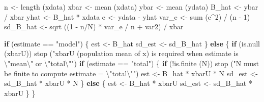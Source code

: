 \documentclass[
  letterpaper,
  DIV=11,
  numbers=noendperiod]{scrreprt}
\newenvironment{Shaded}{\begin{snugshade}}{\end{snugshade}}
\newcommand{\ControlFlowTok}[1]{\textcolor[rgb]{0.00,0.23,0.31}{\textbf{#1}}}
\newcommand{\DecValTok}[1]{\textcolor[rgb]{0.68,0.00,0.00}{#1}}
\newcommand{\FunctionTok}[1]{\textcolor[rgb]{0.28,0.35,0.67}{#1}}
\newcommand{\NormalTok}[1]{\textcolor[rgb]{0.00,0.23,0.31}{#1}}
\newcommand{\OtherTok}[1]{\textcolor[rgb]{0.00,0.23,0.31}{#1}}
\newcommand{\SpecialCharTok}[1]{\textcolor[rgb]{0.37,0.37,0.37}{#1}}
\newcommand{\StringTok}[1]{\textcolor[rgb]{0.13,0.47,0.30}{#1}}
\renewcommand{\[}{\begin{equation}}
\renewcommand{\]}{\end{equation}}
\begin{document}
\begin{Shaded}
\begin{Highlighting}[]
\NormalTok{  n }\OtherTok{\textless{}{-}} \FunctionTok{length}\NormalTok{ (xdata)}
\NormalTok{  xbar }\OtherTok{\textless{}{-}} \FunctionTok{mean}\NormalTok{ (xdata)}
\NormalTok{  ybar }\OtherTok{\textless{}{-}} \FunctionTok{mean}\NormalTok{ (ydata)}
\NormalTok{  B\_hat }\OtherTok{\textless{}{-}}\NormalTok{ ybar }\SpecialCharTok{/}\NormalTok{ xbar}
\NormalTok{  yhat }\OtherTok{\textless{}{-}}\NormalTok{ B\_hat }\SpecialCharTok{*}\NormalTok{ xdata}
\NormalTok{  e }\OtherTok{\textless{}{-}}\NormalTok{ ydata }\SpecialCharTok{{-}}\NormalTok{ yhat}
\NormalTok{  var\_e }\OtherTok{\textless{}{-}} \FunctionTok{sum}\NormalTok{ (e}\SpecialCharTok{\^{}}\DecValTok{2}\NormalTok{) }\SpecialCharTok{/}\NormalTok{ (n }\SpecialCharTok{{-}} \DecValTok{1}\NormalTok{)}
\NormalTok{  sd\_B\_hat }\OtherTok{\textless{}{-}} \FunctionTok{sqrt}\NormalTok{ ((}\DecValTok{1} \SpecialCharTok{{-}}\NormalTok{ n}\SpecialCharTok{/}\NormalTok{N) }\SpecialCharTok{*}\NormalTok{ var\_e }\SpecialCharTok{/}\NormalTok{ n }\SpecialCharTok{+}\NormalTok{ var2) }\SpecialCharTok{/}\NormalTok{ xbar}

  \ControlFlowTok{if}\NormalTok{ (estimate }\SpecialCharTok{==} \StringTok{"model"}\NormalTok{)}
\NormalTok{  \{}
\NormalTok{      est }\OtherTok{\textless{}{-}}\NormalTok{ B\_hat}
\NormalTok{      sd\_est }\OtherTok{\textless{}{-}}\NormalTok{ sd\_B\_hat}
\NormalTok{  \}}
  \ControlFlowTok{else}
\NormalTok{  \{}
      \ControlFlowTok{if}\NormalTok{ (}\FunctionTok{is.null}\NormalTok{ (xbarU))}
          \FunctionTok{stop}\NormalTok{ (}\StringTok{"xbarU (population mean of x) is required when estimate is }\SpecialCharTok{\textbackslash{}"}\StringTok{mean}\SpecialCharTok{\textbackslash{}"}\StringTok{ or }\SpecialCharTok{\textbackslash{}"}\StringTok{total}\SpecialCharTok{\textbackslash{}"}\StringTok{"}\NormalTok{)}
      \ControlFlowTok{if}\NormalTok{ (estimate }\SpecialCharTok{==} \StringTok{"total"}\NormalTok{)}
\NormalTok{      \{}
          \ControlFlowTok{if}\NormalTok{ (}\SpecialCharTok{!}\FunctionTok{is.finite}\NormalTok{ (N))}
              \FunctionTok{stop}\NormalTok{ (}\StringTok{"N must be finite to compute estimate = }\SpecialCharTok{\textbackslash{}"}\StringTok{total}\SpecialCharTok{\textbackslash{}"}\StringTok{"}\NormalTok{)}
\NormalTok{          est }\OtherTok{\textless{}{-}}\NormalTok{ B\_hat }\SpecialCharTok{*}\NormalTok{ xbarU }\SpecialCharTok{*}\NormalTok{ N}
\NormalTok{          sd\_est }\OtherTok{\textless{}{-}}\NormalTok{ sd\_B\_hat }\SpecialCharTok{*}\NormalTok{ xbarU }\SpecialCharTok{*}\NormalTok{ N}
\NormalTok{      \}}
      \ControlFlowTok{else}
\NormalTok{      \{}
\NormalTok{          est }\OtherTok{\textless{}{-}}\NormalTok{ B\_hat }\SpecialCharTok{*}\NormalTok{ xbarU}
\NormalTok{          sd\_est }\OtherTok{\textless{}{-}}\NormalTok{ sd\_B\_hat }\SpecialCharTok{*}\NormalTok{ xbarU}
\NormalTok{      \}}
\NormalTok{  \}}


\end{Highlighting}
\end{Shaded}
\end{document}
